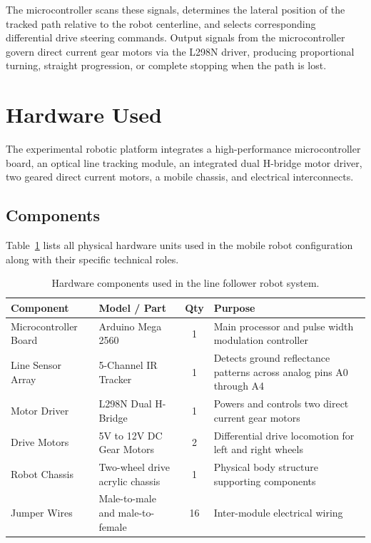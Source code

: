 \documentclass[11pt,a4paper]{article}
\begin{document}
The microcontroller scans these signals, determines the lateral position of the tracked path relative to the robot centerline, and selects corresponding differential drive steering commands. Output signals from the microcontroller govern direct current gear motors via the L298N driver, producing proportional turning, straight progression, or complete stopping when the path is lost.

\section{Hardware Used}
The experimental robotic platform integrates a high-performance microcontroller board, an optical line tracking module, an integrated dual H-bridge motor driver, two geared direct current motors, a mobile chassis, and electrical interconnects.

\subsection{Components}
Table~\ref{tab_components} lists all physical hardware units used in the mobile robot configuration along with their specific technical roles.

\begin{table}[H]
\centering
\begin{tabularx}{\textwidth}{@{}llcX@{}}
\toprule
\textbf{Component} & \textbf{Model / Part} & \textbf{Qty} & \textbf{Purpose} \\
\midrule
Microcontroller Board & Arduino Mega 2560 & 1 & Main processor and pulse width modulation controller \\
Line Sensor Array & 5-Channel IR Tracker & 1 & Detects ground reflectance patterns across analog pins A0 through A4 \\
Motor Driver & L298N Dual H-Bridge & 1 & Powers and controls two direct current gear motors \\
Drive Motors & 5V to 12V DC Gear Motors & 2 & Differential drive locomotion for left and right wheels \\
Robot Chassis & Two-wheel drive acrylic chassis & 1 & Physical body structure supporting components \\
Jumper Wires & Male-to-male and male-to-female & 16 & Inter-module electrical wiring \\
\bottomrule
\end{tabularx}
\caption{Hardware components used in the line follower robot system.}
\label{tab_components}
\end{table}
\end{document}
